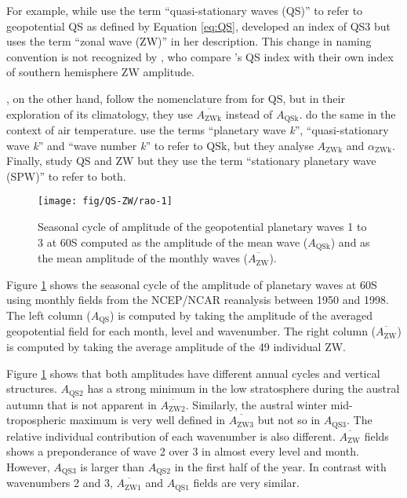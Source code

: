 \documentclass[draft,linenumbers]{agujournal2018}
\begin{document}
For example, while \citet{Quintanar1995a} use the term
``quasi-stationary waves (QS)'' to refer to geopotential QS as defined
by Equation \ref{eq:QS}, \citet{Raphael2004} developed an index of QS3
but uses the term ``zonal wave (ZW)'' in her description. This change in
naming convention is not recognized by \citet{Irving2015}, who compare
\citet{Raphael2004}'s QS index with their own index of southern
hemisphere ZW amplitude.

\citet{Rao2004}, on the other hand, follow the nomenclature from
\citet{Quintanar1995a} for QS, but in their exploration of its
climatology, they use \(\overline{A_\mathrm{ZWk}}\) instead of
\(A_\mathrm{QSk}\). \citet{Kravchenko2012} do the same in the context of
air temperature. \citet{Turner2017} use the terms ``planetary wave
\emph{k}'', ``quasi-stationary wave \emph{k}'' and ``wave number
\emph{k}'' to refer to \(\mathrm{QSk}\), but they analyse
\(A_\mathrm{ZWk}\) and \(\alpha_\mathrm{ZWk}\). Finally,
\citet{Lastovicka2018} study QS and ZW but they use the term
``stationary planetary wave (SPW)'' to refer to both.

\begin{figure}[h]

{\centering \texttt{[image: fig/QS-ZW/rao-1]} 

}

\caption{Seasonal cycle of amplitude of the geopotential planetary waves 1 to 3 at 60\degree S computed as the amplitude of the mean wave ($A_\mathrm{QSk}$) and as the mean amplitude of the monthly waves ($\overline{A_\mathrm{ZW} }$).}\label{fig:rao}
\end{figure}

Figure \ref{fig:rao} shows the seasonal cycle of the amplitude of
planetary waves at 60\degree S using monthly fields from the NCEP/NCAR
reanalysis \citep{Kalnay1996} between 1950 and 1998. The left column
(\(A_\mathrm{QS}\)) is computed by taking the amplitude of the averaged
geopotential field for each month, level and wavenumber. The right
column (\(\overline{A_\mathrm{ZW}}\)) is computed by taking the average
amplitude of the 49 individual ZW.

Figure \ref{fig:rao} shows that both amplitudes have different annual
cycles and vertical structures. \(A_\mathrm{QS2}\) has a strong minimum
in the low stratosphere during the austral autumn that is not apparent
in \(\overline{A_\mathrm{ZW2}}\). Similarly, the austral winter
mid-tropospheric maximum is very well defined in
\(\overline{A_\mathrm{ZW3}}\) but not so in \(A_\mathrm{QS3}\). The
relative individual contribution of each wavenumber is also different.
\(\overline{A_\mathrm{ZW}}\) fields shows a preponderance of wave 2 over
3 in almost every level and month. However, \(A_\mathrm{QS3}\) is larger
than \(A_\mathrm{QS2}\) in the first half of the year. In contrast with
wavenumbers 2 and 3, \(\overline{A_\mathrm{ZW1}}\) and
\(A_\mathrm{QS1}\) fields are very similar.
\end{document}
